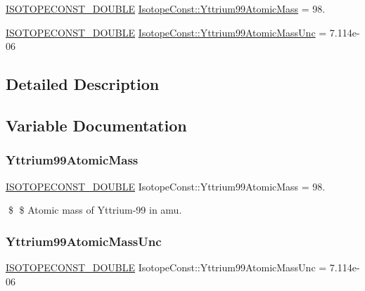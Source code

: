 \begin{DoxyCompactItemize}
\item 
\mbox{\hyperlink{group___isotope_const-_macros_ga8f45a7272ce02c0b4c65c44636ed719a}{I\+S\+O\+T\+O\+P\+E\+C\+O\+N\+S\+T\+\_\+\+D\+O\+U\+B\+LE}} \mbox{\hyperlink{group___isotope_const-_yttrium-_y99_gac2273f2769cec0837321890b2743629c}{Isotope\+Const\+::\+Yttrium99\+Atomic\+Mass}} = 98.
\item 
\mbox{\hyperlink{group___isotope_const-_macros_ga8f45a7272ce02c0b4c65c44636ed719a}{I\+S\+O\+T\+O\+P\+E\+C\+O\+N\+S\+T\+\_\+\+D\+O\+U\+B\+LE}} \mbox{\hyperlink{group___isotope_const-_yttrium-_y99_ga3ec8a2f0bec16fd2c8e75d249f63a420}{Isotope\+Const\+::\+Yttrium99\+Atomic\+Mass\+Unc}} = 7.\+114e-\/06
\end{DoxyCompactItemize}


\subsection{Detailed Description}


\subsection{Variable Documentation}
\mbox{\label{group___isotope_const-_yttrium-_y99_gac2273f2769cec0837321890b2743629c}} 
\subsubsection{\texorpdfstring{Yttrium99\+Atomic\+Mass}{Yttrium99AtomicMass}}
{\footnotesize\ttfamily \mbox{\hyperlink{group___isotope_const-_macros_ga8f45a7272ce02c0b4c65c44636ed719a}{I\+S\+O\+T\+O\+P\+E\+C\+O\+N\+S\+T\+\_\+\+D\+O\+U\+B\+LE}} Isotope\+Const\+::\+Yttrium99\+Atomic\+Mass = 98.}

\$ \$ Atomic mass of Yttrium-\/99 in amu. \mbox{\label{group___isotope_const-_yttrium-_y99_ga3ec8a2f0bec16fd2c8e75d249f63a420}} 
\subsubsection{\texorpdfstring{Yttrium99\+Atomic\+Mass\+Unc}{Yttrium99AtomicMassUnc}}
{\footnotesize\ttfamily \mbox{\hyperlink{group___isotope_const-_macros_ga8f45a7272ce02c0b4c65c44636ed719a}{I\+S\+O\+T\+O\+P\+E\+C\+O\+N\+S\+T\+\_\+\+D\+O\+U\+B\+LE}} Isotope\+Const\+::\+Yttrium99\+Atomic\+Mass\+Unc = 7.\+114e-\/06}

